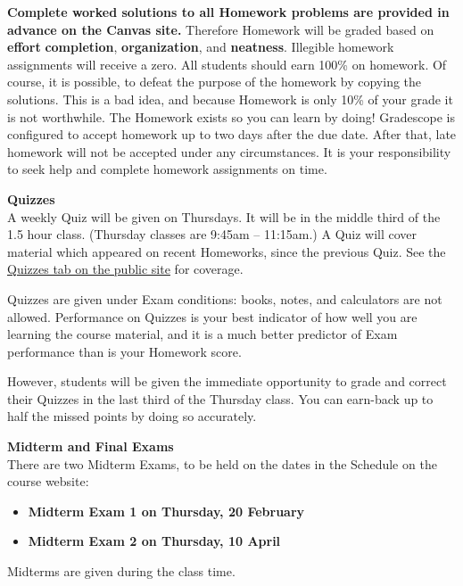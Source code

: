 \documentclass[12pt]{article}
\renewcommand{\emph}[1]{\textsf{\textbf{#1}}}
\newcommand{\localhead}[1]{\par\smallskip\textbf{#1} \smallskip\nobreak\\}%
\def\heading#1{\localhead{\large\emph{#1}}}
\begin{document}
\newpage
 
\emph{Complete worked solutions to all Homework problems are provided
in advance on the Canvas site.}  Therefore Homework will be graded
based on \emph{effort} \emph{completion}, \emph{organization}, and
\emph{neatness}.  Illegible homework assignments will receive a
zero. All students should
earn 100\% on homework.  Of course, it is possible, to defeat the
purpose of the homework by copying the solutions.  This is a bad idea,
and because Homework is only 10\% of your grade it is not worthwhile.
The Homework exists so you can learn by doing! Gradescope is
configured to accept homework up to two days after the due date. After
that, late homework will not be accepted under any circumstances. It
is your responsibility to seek help and complete homework
assignments on time.



\heading{Quizzes}
A weekly Quiz will be given on Thursdays.  It will be in the middle
third of the 1.5 hour class.  (Thursday classes are 9:45am --
11:15am.)  A Quiz will cover material which appeared on recent
Homeworks, since the previous Quiz.  See the
\href{https://uaf-math251.github.io/calc2/quizzes.html}{Quizzes tab on
the public site} for coverage.

Quizzes are given under Exam conditions: books, notes, and calculators
are not allowed.  Performance on Quizzes is your best indicator of how
well you are learning the course material, and it is a much better
predictor of Exam performance than is your Homework score.

However, students will be given the immediate opportunity to grade and
correct their Quizzes in the last third of the Thursday class.  You
can earn-back up to half the missed points by doing so accurately.


\heading{Midterm and Final Exams}
There are two Midterm Exams, to be held on the dates in the Schedule on the course website:
\begin{itemize}
\item \emph{Midterm Exam 1 on Thursday, 20 February}
\item \emph{Midterm Exam 2 on Thursday, 10 April}
\end{itemize}
Midterms are given during the class time.
\end{document}

